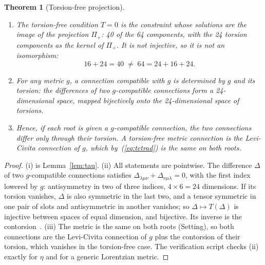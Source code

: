\documentclass[twocolumn]{iopjournal}
\newtheorem{theorem}{Theorem}
\theoremstyle{definition}
\theoremstyle{remark}
\begin{document}
\begin{theorem}[Torsion-free projection]
\label{thm:proj}
\begin{enumerate}
\item[(i)] The torsion-free condition $T = 0$ is the constraint
  whose solutions are the image of the projection $\Pi_+$: 40 of the
  64 components, with the 24 torsion components as the kernel of $\Pi_+$. It is not injective, so it is not an isomorphism:
  \begin{equation}
    \boxed{16 + 24 = 40 \;\neq\; 64 = 24 + 16 + 24.}
    \label{eq:noniso}
  \end{equation}
\item[(ii)] For any metric $g$, a connection compatible with $g$ is
  determined by $g$ and its torsion: the differences of two
  $g$-compatible connections form a 24-dimensional space, mapped
  bijectively onto the 24-dimensional space of torsions.
\item[(iii)] Hence, if each root is given a $g$-compatible connection,
  the two connections differ only through their torsion. A
  torsion-free metric connection is the Levi-Civita connection of
  $g$, which by~(\ref{eq:tetrad}) is the same on both roots.
\end{enumerate}
\end{theorem}

\begin{proof}
(i) is Lemma~\ref{lem:tau}. (ii) All statements are pointwise. The difference $\Delta$ of two
$g$-compatible connections satisfies
$\Delta_{\lambda\mu\nu} + \Delta_{\nu\mu\lambda} = 0$, with the first
index lowered by $g$: antisymmetry in two of three indices, $4\times6
= 24$ dimensions. If its torsion vanishes, $\Delta$ is also symmetric
in the last two, and a tensor symmetric in one pair of slots and
antisymmetric in another vanishes; so $\Delta \mapsto T(\Delta)$ is
injective between spaces of equal dimension, and bijective. Its
inverse is the contorsion~\cite{Hehl1976}. (iii) The metric is the
same on both roots (Setting), so both connections are the Levi-Civita
connection of $g$ plus the contorsion of their torsion, which
vanishes in the torsion-free case. The verification script checks (ii)
exactly for $\eta$ and for a generic Lorentzian metric.
\end{proof}
\end{document}
